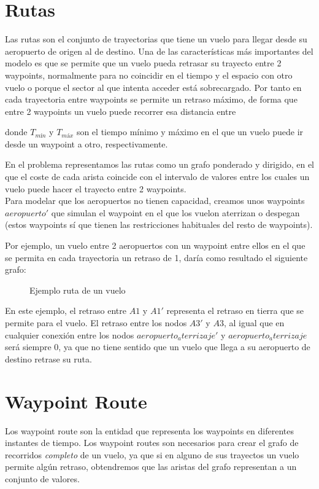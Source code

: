 \section{Rutas}
Las rutas son el conjunto de trayectorias que tiene un vuelo para llegar desde su aeropuerto de origen al de destino. Una de las características más importantes del modelo es que se permite que un vuelo pueda retrasar su trayecto entre 2 waypoints, normalmente para no coincidir en el tiempo y el espacio con otro vuelo o porque el sector al que intenta acceder está sobrecargado. Por tanto en cada trayectoria entre waypoints se permite un retraso máximo, de forma que entre 2 waypoints un vuelo puede recorrer esa distancia entre
\begin{equation}
[T_{mín} , T_{máx}]
\end{equation}

donde 	$T_{mín}$ y $T_{máx}$ son el tiempo mínimo y máximo en el que un vuelo puede ir desde un waypoint a otro, respectivamente.

 En el problema representamos las rutas como un grafo ponderado y dirigido, en el que el coste de cada arista coincide con el intervalo de valores entre los cuales un vuelo puede hacer el trayecto entre 2 waypoints.\\
Para modelar que los aeropuertos no tienen capacidad, creamos unos waypoints $aeropuerto'$ que simulan el waypoint en el que los vuelon aterrizan o despegan (estos waypoints sí que tienen las restricciones habituales del resto de waypoints).

Por ejemplo, un vuelo entre 2 aeropuertos con un waypoint entre ellos en el que se permita en cada trayectoria un retraso de 1, daría como resultado el siguiente grafo:
\begin{figure}[H]
	\centering
	
	\caption{Ejemplo ruta de un vuelo}
	\label{fig: Ejemplo ruta de un vuelo}
\end{figure}

En este ejemplo, el retraso entre $A1$ y $A1'$ representa el retraso en tierra que se permite para el vuelo. El retraso entre los nodos $A3'$ y $A3$, al igual que en cualquier conexión entre los nodos $aeropuerto_aterrizaje'$ y $aeropuerto_aterrizaje$ será siempre 0, ya que no tiene sentido que un vuelo que llega a su aeropuerto de destino retrase su ruta.


\section{Waypoint Route}
Los waypoint route son la entidad que representa los waypoints en diferentes instantes de tiempo. Los waypoint routes son necesarios para crear el grafo de recorridos \textit{completo} de un vuelo, ya que si en alguno de sus trayectos un vuelo permite algún retraso, obtendremos que las aristas del grafo representan a un conjunto de valores.\\

